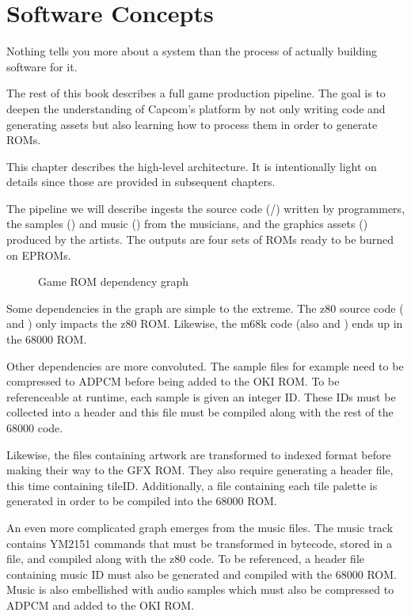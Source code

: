 \chapter{Software Concepts}

Nothing tells you more about a system than the process of actually building software for it.

The rest of this book describes a full game production pipeline. The goal is to deepen the understanding of Capcom's platform by not only writing code and generating assets but also learning how to process them in order to generate ROMs.

This chapter describes the high-level architecture. It is intentionally light on details since those are provided in subsequent chapters.

The pipeline we will describe ingests the source code (/) written by programmers, the samples () and music () from the musicians, and the graphics assets () produced by the artists. The outputs are four sets of ROMs ready to be burned on EPROMs. 

 \begin{figure}[H]
\caption*{Game ROM dependency graph}
\end{figure}

\pagebreak
Some dependencies in the graph are simple to the extreme. The z80 source code ( and ) only impacts the z80 ROM. Likewise, the m68k code (also  and ) ends up in the 68000 ROM.

Other dependencies are more convoluted. The  sample files for example need to be compressed to ADPCM before being added to the OKI ROM. To be referenceable at runtime, each sample is given an integer ID. These IDs must be collected into a  header and this file must be compiled along with the rest of the 68000 code.

Likewise, the  files containing artwork are transformed to indexed format before making their way to the GFX ROM. They also require generating a  header file, this time containing tileID. Additionally, a  file containing each tile palette is generated in order to be compiled into the 68000 ROM. 

An even more complicated graph emerges from the music  files. The music track contains YM2151 commands that must be transformed in bytecode, stored in a  file, and compiled along with the z80 code. To be referenced, a header file containing music ID must also be generated and compiled with the 68000 ROM. Music is also embellished with audio samples which must also be compressed to ADPCM and added to the OKI ROM.

